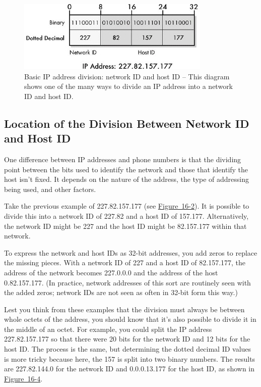 \begin{figure}
   \centering
   \includegraphics[width=.6\textwidth]{images/ip-address-division.jpg}
   \caption{Basic IP address division: network ID and host ID -- This diagram shows one of the many ways to divide an IP address into a network ID and host ID.}
   \label{fig:ip-address-division}
\end{figure}



\subsection{Location of the Division Between Network ID and Host ID}

One difference between IP addresses and phone numbers is that the
dividing point between the bits used to identify the network and those
that identify the host isn't fixed. It depends on the nature of the
address, the type of addressing being used, and other factors.

Take the previous example of 227.82.157.177 (see
\protect\hyperlink{ch16s02.htmlux5cux23ip_address_binary_hexadecimal_and_dotted}{Figure~16-2}).
It is possible to divide this into a network ID of 227.82 and a host ID
of 157.177. Alternatively, the network ID might be 227 and the host ID
might be 82.157.177 within that network.

To express the network and host IDs as 32-bit addresses, you add zeros
to replace the missing pieces. With a network ID of 227 and a host ID of
82.157.177, the address of the network becomes 227.0.0.0 and the address
of the host 0.82.157.177. (In practice, network addresses of this sort
are routinely seen with the added zeros; network IDs are not seen as
often in 32-bit form this way.)

Lest you think from these examples that the
\protect\hypertarget{ch16s03.htmlux5cux23idx-CHP-16-0663}{}{}division
must always be between whole octets of the address, you should know that
it's also possible to divide it in the middle of an octet. For example,
you could split the IP address 227.82.157.177 so that there were 20 bits
for the network ID and 12 bits for the host ID. The process is the same,
but determining the dotted decimal ID values is more tricky because
here, the 157 is split into two binary numbers. The results are
227.82.144.0 for the network ID and 0.0.0.13.177 for the host ID, as
shown in
\protect\hyperlink{ch16s03.htmlux5cux23mid-octet_ip_address_division_ip_address}{Figure~16-4}.

